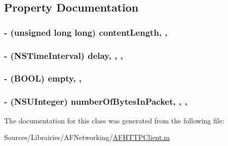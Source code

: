 \subsection{Property Documentation}
\hypertarget{interface_a_f_multipart_body_stream_aaee3ebc73e6cade317c7524089880b3d}{
\subsubsection[{content\-Length}]{\setlength{\rightskip}{0pt plus 5cm}-\/ (unsigned long long) content\-Length\hspace{0.3cm}{\ttfamily [read]}, {\ttfamily [nonatomic]}, {\ttfamily [assign]}}}\label{interface_a_f_multipart_body_stream_aaee3ebc73e6cade317c7524089880b3d}
\hypertarget{interface_a_f_multipart_body_stream_aabbac8502bef80a07707380ebadb2791}{
\subsubsection[{delay}]{\setlength{\rightskip}{0pt plus 5cm}-\/ (N\-S\-Time\-Interval) delay\hspace{0.3cm}{\ttfamily [read]}, {\ttfamily [write]}, {\ttfamily [nonatomic]}, {\ttfamily [assign]}}}\label{interface_a_f_multipart_body_stream_aabbac8502bef80a07707380ebadb2791}
\hypertarget{interface_a_f_multipart_body_stream_ae9b2a8f4b9b328d29f0b7c64410577c9}{
\subsubsection[{empty}]{\setlength{\rightskip}{0pt plus 5cm}-\/ (B\-O\-O\-L) empty\hspace{0.3cm}{\ttfamily [read]}, {\ttfamily [nonatomic]}, {\ttfamily [assign]}}}\label{interface_a_f_multipart_body_stream_ae9b2a8f4b9b328d29f0b7c64410577c9}
\hypertarget{interface_a_f_multipart_body_stream_a4f5df6b4fa6024d8bbedf72f2bef974d}{
\subsubsection[{number\-Of\-Bytes\-In\-Packet}]{\setlength{\rightskip}{0pt plus 5cm}-\/ (N\-S\-U\-Integer) number\-Of\-Bytes\-In\-Packet\hspace{0.3cm}{\ttfamily [read]}, {\ttfamily [write]}, {\ttfamily [nonatomic]}, {\ttfamily [assign]}}}\label{interface_a_f_multipart_body_stream_a4f5df6b4fa6024d8bbedf72f2bef974d}


The documentation for this class was generated from the following file\-:\begin{DoxyCompactItemize}
\item 
Sources/\-Librairies/\-A\-F\-Networking/\hyperlink{_a_f_h_t_t_p_client_8m}{A\-F\-H\-T\-T\-P\-Client.\-m}\end{DoxyCompactItemize}
